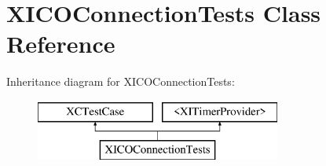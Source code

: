 \hypertarget{interface_x_i_c_o_connection_tests}{}\section{X\+I\+C\+O\+Connection\+Tests Class Reference}
\label{interface_x_i_c_o_connection_tests}
Inheritance diagram for X\+I\+C\+O\+Connection\+Tests\+:\begin{figure}[H]
\begin{center}
\leavevmode
\includegraphics[height=2.000000cm]{interface_x_i_c_o_connection_tests}
\end{center}
\end{figure}
